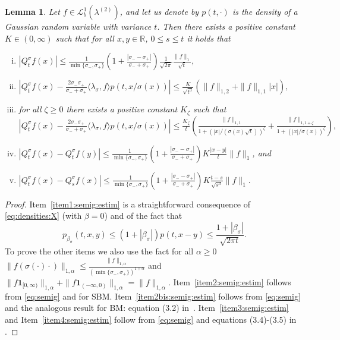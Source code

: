 \documentclass[12pt]{article}
\numberwithin{equation}{section}
\newtheorem{lemma}{Lemma}
\theoremstyle{definition}
\theoremstyle{remark}
\newcommand{\RR}{\mathbb{R}}
\newcommand{\ind}[1]{\mathbf{1}_{#1}}
\newcommand{\Lgb}[1]{\mathcal{L}^{1}_{b}(\lambda^{(#1)})}
\begin{document}
\begin{lemma} \label{lem:semig:estim}
Let $f\in \Lgb{2}$, and let us denote by $p(t,\cdot)$ is the density of a Gaussian random variable with variance $t$.
Then there exists a positive constant $K\in (0,\infty)$ such that for all $x,y\in \RR$, $0 \leq s\leq t$ it holds that
\begin{enumerate}[i)]
	\item  \label{item1:semig:estim}
$
	|Q^\sigma_t f (x)| \leq \frac1{\min\{\sigma_-, \sigma_+\}} \left(1+\frac{|\sigma_- -\sigma_+|}{\sigma_-+\sigma_+}\right) \frac1{\sqrt{2 \pi}} \frac{\|f\|_{1}}{\sqrt t}, 
$
	\item \label{item2:semig:estim}
$ 
	\left| Q^\sigma_t f (x)  - \frac{2 \sigma_-\sigma_+}{\sigma_-+\sigma_+} \langle \lambda_\sigma , f \rangle p(t,{x}/{\sigma(x)}) \right|\leq \frac{K}{\sqrt{t^3}} \left( \| f \|_{1,2} +\| f \|_{1,1} |x|\right),
$
	\item \label{item2bis:semig:estim} for all $\zeta \geq 0 $ there exists a positive constant $K_\zeta$ such that\\
$ 
	\left| Q^\sigma_t f (x)  - \frac{2 \sigma_-\sigma_+}{\sigma_-+\sigma_+} \langle \lambda_\sigma , f \rangle p(t,{x}/{\sigma(x)}) \right|
\leq  
\frac{K_\zeta}{t} \left( \frac{\| f \|_{1,1}}{1+(|x|/(\sigma(x)\sqrt{t}))^\zeta} +\frac{\| f \|_{1,1+\zeta}}{1+(|x|/\sigma(x))^\zeta} \right),
$
	\item  \label{item3:semig:estim}
$ 
	\left| Q^\sigma_t f (x)  - Q^\sigma_t f (y) \right| 
\leq \frac1{\min\{\sigma_-, \sigma_+\}} \left(1+\frac{|\sigma_- -\sigma_+|}{\sigma_-+\sigma_+}\right) K \frac{|x-y|}{t} \|f\|_{1}
$, and
	\item  \label{item4:semig:estim}
$ 
	\left| Q^\sigma_t f (x)  - Q^\sigma_s f (x) \right| \leq  \frac1{\min\{\sigma_-, \sigma_+\}} \left(1+\frac{|\sigma_- -\sigma_+|}{\sigma_-+\sigma_+}\right) K \frac{t-s}{\sqrt{s^{3}}} \|f\|_{1}.
$
\end{enumerate}
\end{lemma}
\begin{proof}
Item~\ref{item1:semig:estim} is a straightforward consequence of \eqref{eq:densities:X} (with $\beta=0$) and of the fact that 
\begin{equation}
	p_{\beta_\sigma} (t,x,y) 
 \leq (1+|{\beta_\sigma}|) p(t,x-y) 
\leq \frac{1+|{\beta_\sigma}|}{\sqrt{2\pi t}}.
\end{equation}
To prove the other items we also use the fact for all $\alpha \geq 0$
$\| f(\sigma(\cdot)\cdot) \|_{1,\alpha} \leq \frac{\| f \|_{1,\alpha}}{(\min{\{\sigma_-,\sigma_+ \}})^{1+\alpha}}$ and 
$\| f \ind{[0,\infty)} \|_{1,\alpha} + \| f \ind{(-\infty,0)} \|_{1,\alpha}= \| f \|_{1,\alpha}$.
Item~\ref{item2:semig:estim} follows from \eqref{eq:semig} and \cite[Lemma~1]{lmt1} for SBM.
Item~\ref{item2bis:semig:estim} follows from \eqref{eq:semig} and the analogous result for BM: equation (3.2) in~\cite[Lemma~3.1]{j1}.
Item~\ref{item3:semig:estim} and Item~\ref{item4:semig:estim} follow from \eqref{eq:semig} and equations (3.4)-(3.5) in \cite[Lemma~3.1]{j1}.
\end{proof}
\end{document}
